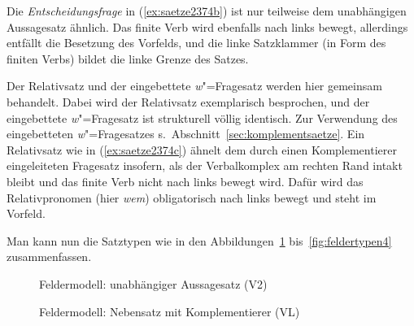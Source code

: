 Die \textit{Entscheidungsfrage} in (\ref{ex:saetze2374b}) ist nur teilweise dem unabhängigen Aussagesatz ähnlich.
Das finite Verb wird ebenfalls nach links bewegt, allerdings entfällt die Besetzung des Vorfelds, und die linke Satzklammer (in Form des finiten Verbs) bildet die linke Grenze des Satzes.


Der Relativsatz und der eingebettete \textit{w}"=Fragesatz werden hier gemeinsam behandelt.
Dabei wird der Relativsatz exemplarisch besprochen, und der eingebettete \textit{w}"=Fragesatz ist strukturell völlig identisch.
Zur Verwendung des eingebetteten \textit{w}"=Fragesatzes s.\ Abschnitt~\ref{sec:komplementsaetze}.
Ein Relativsatz wie in (\ref{ex:saetze2374c}) ähnelt dem durch einen Komplementierer eingeleiteten Fragesatz insofern, als der Verbalkomplex am rechten Rand intakt bleibt und das finite Verb nicht nach links bewegt wird.
Dafür wird das Relativpronomen (hier \textit{wem}) obligatorisch nach links bewegt und steht im Vorfeld.

Man kann nun die Satztypen wie in den Abbildungen~\ref{fig:feldertypen1} bis~\ref{fig:feldertypen4} zusammenfassen.

\begin{figure}
  \caption{Feldermodell: unabhängiger Aussagesatz (V2)}
  \label{fig:feldertypen1}
\end{figure}

\begin{figure}
  \caption{Feldermodell: Nebensatz mit Komplementierer (VL)}
  \label{fig:feldertypen2}
\end{figure}

